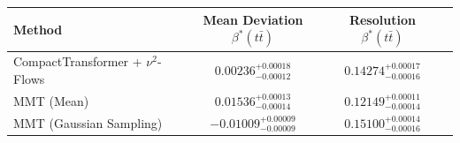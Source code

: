     \begin{tabular}{lccc}
        \toprule
        Method & Mean Deviation $\beta^*(t\bar{t})$ & Resolution $\beta^*(t\bar{t})$ \\
        \midrule
        CompactTransformer + $\nu^2$-Flows & $0.00236^{+0.00018}_{-0.00012}$ & $0.14274^{+0.00017}_{-0.00016}$ \\
        MMT (Mean) & $0.01536^{+0.00013}_{-0.00014}$ & $0.12149^{+0.00011}_{-0.00014}$ \\
        MMT (Gaussian Sampling) & $-0.01009^{+0.00009}_{-0.00009}$ & $0.15100^{+0.00014}_{-0.00016}$ \\
        \bottomrule
    \end{tabular}